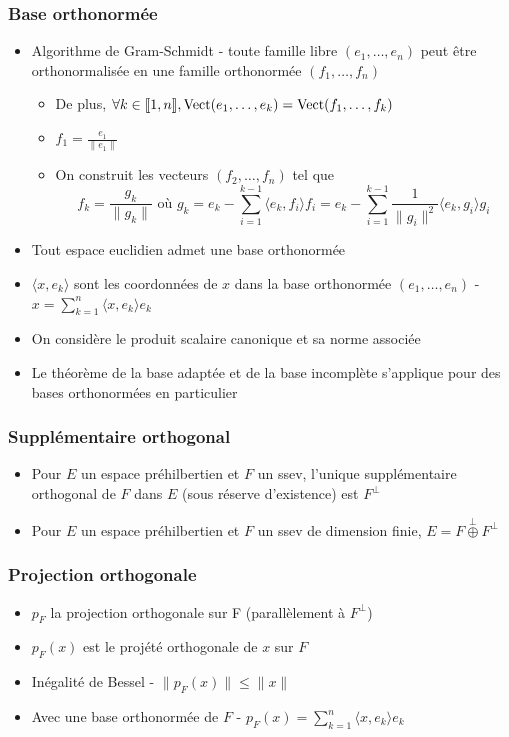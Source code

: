 \documentclass[openany]{book}
\begin{document}
\subsubsection{Base orthonormée}

\begin{itemize}
    \item Algorithme de Gram-Schmidt - toute famille libre $(e_1,\dots,e_n)$ peut être orthonormalisée en une famille orthonormée $(f_1,\dots,f_n)$
    \begin{itemize}
        \item De plus, $\forall k \in \llbracket 1, n \rrbracket, \text{Vect} (e_1, \dots, e_k) = \text{Vect} (f_1, \dots, f_k)$
        \item $f_1 = \frac{e_1}{\|e_1\|}$
        \item On construit les vecteurs $(f_2, \dots, f_n)$ tel que \[ f_k = \frac{g_k}{\|g_k\|} \text{ où } g_k = e_k - \sum_{i=1}^{k-1} \langle e_k, f_i \rangle f_i = e_k - \sum_{i=1}^{k-1} \frac{1}{\|g_i\|^2} \langle e_k, g_i \rangle g_i  \]
    \end{itemize}
    \item Tout espace euclidien admet une base orthonormée
    \item $\langle x, e_k \rangle$ sont les coordonnées de $x$ dans la base orthonormée $(e_1, \dots, e_n)$ - $ x = \sum_{k=1}^{n} \langle x, e_k \rangle e_k $
    \item On considère le produit scalaire canonique et sa norme associée
    \item Le théorème de la base adaptée et de la base incomplète s'applique pour des bases orthonormées en particulier
\end{itemize}

\subsubsection{Supplémentaire orthogonal}
\begin{itemize}
    \item Pour $E$ un espace préhilbertien et $F$ un ssev, l'unique supplémentaire orthogonal de $F$ dans $E$ (sous réserve d'existence) est $F^{\perp}$
    \item Pour $E$ un espace préhilbertien et $F$ un ssev de dimension finie, $E = F \overset{\perp}{\oplus} F^{\perp}$ 
\end{itemize}

\subsubsection{Projection orthogonale}
\begin{itemize}
    \item $p_F$ la projection orthogonale sur F (parallèlement à $F^{\perp}$)
    \item $p_F(x)$ est le projété orthogonale de $x$ sur $F$
    \item Inégalité de Bessel - $ \| p_F(x) \| \leq \|x\| $
    \item Avec une base orthonormée de $F$ - $ p_F(x) = \sum_{k=1}^{n} \langle x, e_k \rangle e_k $
\end{itemize}
\end{document}
